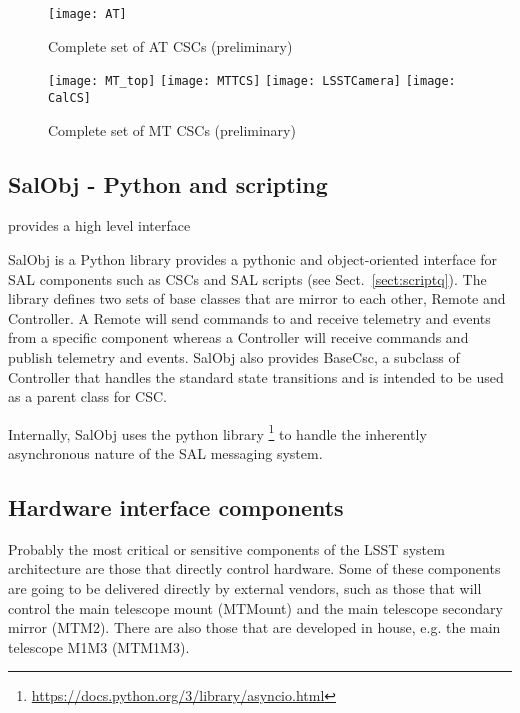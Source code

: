 \begin{figure}
\begin{center}
\texttt{[image: AT]}
\caption{Complete set of AT CSCs (preliminary)\label{fig:atcscs}}
\end{center}
\end{figure}

\begin{figure}
\begin{center}
\texttt{[image: MT\_top]}
\texttt{[image: MTTCS]}
\texttt{[image: LSSTCamera]}
\texttt{[image: CalCS]}
\caption{Complete set of MT CSCs (preliminary)\label{fig:mtcscs}}
\end{center}
\end{figure}

\subsection{SalObj - Python and scripting }\label{sect:salobj}

provides a high level interface 

SalObj is a Python library provides a pythonic and object-oriented interface for SAL components such as CSCs and SAL 
scripts (see Sect.~\ref{sect:scriptq}). The library defines two sets of base classes that are mirror to each other, 
Remote and Controller. A Remote will send commands to and receive telemetry and events from a specific component whereas a 
Controller will receive commands and publish telemetry and events. SalObj also provides BaseCsc, a subclass of Controller 
that handles the standard state transitions and is intended to be used as a parent class for CSC.

Internally, SalObj uses the python library \asyncio\footnote{\url{https://docs.python.org/3/library/asyncio.html}} to handle the 
inherently asynchronous nature of the SAL messaging system.

\subsection{Hardware interface components}\label{sect:hardware_csc}
Probably the most critical or sensitive components of the LSST system architecture are those that directly control hardware. Some 
of these components are going to be delivered directly by external vendors, such as those that will control the main telescope 
mount (MTMount) and the main telescope secondary mirror (MTM2). There are also those that are developed in house, e.g. the 
main telescope M1M3 (MTM1M3).

